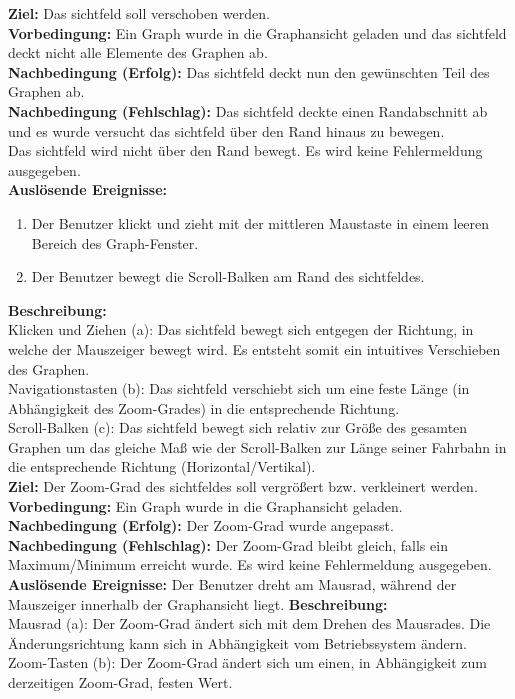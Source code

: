 \label{fa:verschieben}
\textbf{Ziel:} Das \gls{sichtfeld} soll verschoben werden.\\
\textbf{Vorbedingung:} Ein Graph wurde in die Graphansicht geladen und das \gls{sichtfeld} deckt nicht alle Elemente des Graphen ab.\\
\textbf{Nachbedingung (Erfolg):}  Das \gls{sichtfeld} deckt nun den gewünschten Teil des Graphen ab.\\
\textbf{Nachbedingung (Fehlschlag):} Das \gls{sichtfeld} deckte einen Randabschnitt ab und es wurde versucht das \gls{sichtfeld} über den Rand hinaus zu bewegen.\\
Das \gls{sichtfeld} wird nicht über den Rand bewegt. Es wird keine Fehlermeldung ausgegeben.\\
\textbf{Auslösende Ereignisse:}
\begin{enumerate}[nolistsep, label=(\alph*)]
  \item Der Benutzer klickt und zieht mit der mittleren Maustaste in einem leeren Bereich des Graph-Fenster.
  \item Der Benutzer bewegt die Scroll-Balken am Rand des \gls{sichtfeld}es. %
\end{enumerate}
\textbf{Beschreibung:}\\
Klicken und Ziehen (a): Das \gls{sichtfeld} bewegt sich entgegen der Richtung, in welche der Mauszeiger bewegt wird. Es entsteht somit ein intuitives Verschieben des Graphen.\\
Navigationstasten (b): Das \gls{sichtfeld} verschiebt sich um eine feste Länge (in Abhängigkeit des Zoom-Grades) in die entsprechende Richtung.\\
Scroll-Balken (c): Das \gls{sichtfeld} bewegt sich relativ zur Größe des gesamten Graphen um das gleiche Maß wie der Scroll-Balken zur Länge seiner Fahrbahn in die entsprechende Richtung (Horizontal/Vertikal).\\

\label{fa:zoom}
\textbf{Ziel:} Der Zoom-Grad des \gls{sichtfeld}es soll vergrößert bzw. verkleinert werden.\\
\textbf{Vorbedingung:} Ein Graph wurde in die Graphansicht geladen.\\
\textbf{Nachbedingung (Erfolg):} Der Zoom-Grad wurde angepasst.\\
\textbf{Nachbedingung (Fehlschlag):} Der Zoom-Grad bleibt gleich, falls ein Maximum/Minimum erreicht wurde. Es wird keine Fehlermeldung ausgegeben.\\
\textbf{Auslösende Ereignisse:} Der Benutzer dreht am Mausrad, während der Mauszeiger innerhalb der Graphansicht liegt.
\textbf{Beschreibung:}\\
Mausrad (a): Der Zoom-Grad ändert sich mit dem Drehen des Mausrades. Die Änderungsrichtung kann sich in Abhängigkeit vom Betriebssystem ändern.\\
Zoom-Tasten (b): Der Zoom-Grad ändert sich um einen, in Abhängigkeit zum derzeitigen Zoom-Grad, festen Wert.\\

